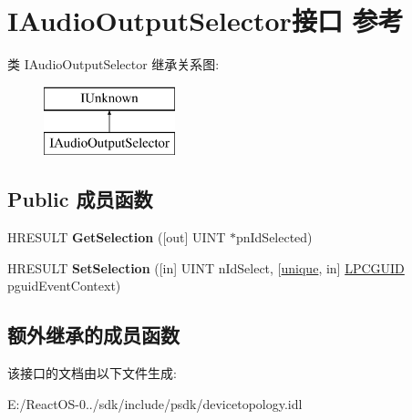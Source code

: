 \hypertarget{interface_i_audio_output_selector}{}\section{I\+Audio\+Output\+Selector接口 参考}
\label{interface_i_audio_output_selector}
类 I\+Audio\+Output\+Selector 继承关系图\+:\begin{figure}[H]
\begin{center}
\leavevmode
\includegraphics[height=2.000000cm]{interface_i_audio_output_selector}
\end{center}
\end{figure}
\subsection*{Public 成员函数}
\begin{DoxyCompactItemize}
\item 
\mbox{\label{interface_i_audio_output_selector_a2b27d4f4ef97b8f1785c486fecf76a24}} 
H\+R\+E\+S\+U\+LT {\bfseries Get\+Selection} (\mbox{[}out\mbox{]} U\+I\+NT $\ast$pn\+Id\+Selected)
\item 
\mbox{\label{interface_i_audio_output_selector_a61cd264dab69fa37725510a1f6bb46c1}} 
H\+R\+E\+S\+U\+LT {\bfseries Set\+Selection} (\mbox{[}in\mbox{]} U\+I\+NT n\+Id\+Select, \mbox{[}\hyperlink{interfaceunique}{unique}, in\mbox{]} \hyperlink{interface_g_u_i_d}{L\+P\+C\+G\+U\+ID} pguid\+Event\+Context)
\end{DoxyCompactItemize}
\subsection*{额外继承的成员函数}


该接口的文档由以下文件生成\+:\begin{DoxyCompactItemize}
\item 
E\+:/\+React\+O\+S-\/0../sdk/include/psdk/devicetopology.\+idl\end{DoxyCompactItemize}
